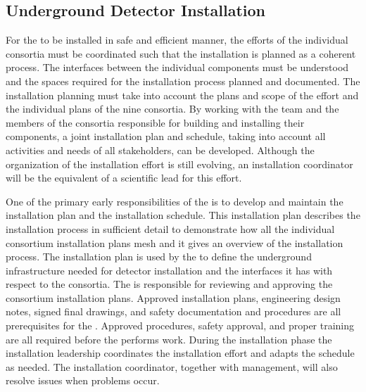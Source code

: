 \subsection{Underground Detector Installation}
\label{sec:fdsp-coord-undergd}

For the  to be installed in safe and efficient
manner, the efforts of the individual consortia must be coordinated
such that the installation is planned as a coherent process. The
interfaces between the individual components must be understood
and the spaces required for the installation process planned and
documented. The installation planning must take into account the
plans and scope of the  effort and the individual plans of
the nine consortia. By working with the  team and the
members of the consortia responsible for building and installing their
components, a joint installation plan and schedule, taking into account
all activities and needs of all stakeholders, can be developed. Although
the organization of the installation effort is still evolving, 
an installation coordinator will be the equivalent of a scientific lead for this effort.

One of the primary early responsibilities of the  is to
develop and maintain the  installation plan and the
installation schedule. This installation plan 
describes the installation process in sufficient detail to demonstrate
how all the individual consortium installation plans mesh and it 
gives an overview of the installation process. The installation plan
is used by the  to define the underground infrastructure
needed for detector installation and the interfaces it has with respect  to 
the consortia. The  is responsible for reviewing and
approving the consortium installation plans. Approved installation
plans, engineering design notes, signed final drawings, and safety
documentation and procedures are all prerequisites for the . 
Approved procedures, safety approval, and
proper training are all required before the  performs
work. During the installation phase the installation leadership 
coordinates the  installation effort and adapts the schedule
as needed. The installation coordinator, together with management, will also
resolve issues when problems occur.

